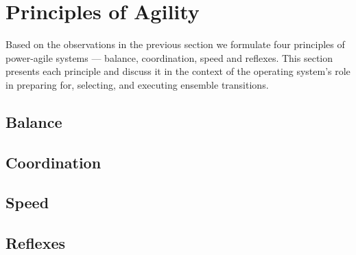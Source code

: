 \section{Principles of Agility}

Based on the observations in the previous section we formulate four
principles of power-agile systems --- balance, coordination, speed and
reflexes. This section presents each principle and discuss it in the context
of the operating system's role in preparing for, selecting, and executing
ensemble transitions.

\subsection{Balance}
\subsection{Coordination}
\subsection{Speed}
\subsection{Reflexes}
